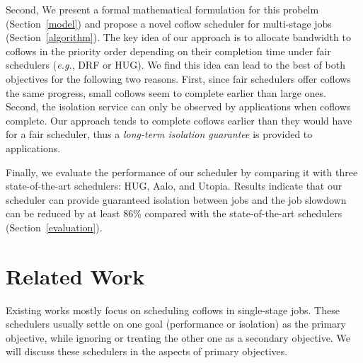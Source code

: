 \documentclass[10pt,journal,compsoc]{IEEEtran}
\begin{document}
Second, We present a formal mathematical formulation for this probelm (Section~\ref{model}) and propose a novel coflow scheduler for multi-stage jobs (Section~\ref{algorithm}).
%
The key idea of our approach is to allocate bandwidth to coflows in the priority order depending on their completion time under fair schedulers (\emph{e.g.}, DRF\cite{DRF} or HUG\cite{HUG}).
%
We find this idea can lead to the best of both objectives for the following two reasons.
%
First, since fair schedulers offer coflows the same progress, small coflows seem to complete earlier than large ones.
Second, the isolation service can only be observed by applications when coflows complete.
%
Our approach tends to complete coflows earlier than they would have for a fair scheduler, thus a \emph{long-term isolation guarantee} is provided to applications.

Finally, we evaluate the performance of our scheduler by comparing it with three state-of-the-art schedulers: HUG\cite{HUG}, Aalo\cite{aalo}, and Utopia\cite{utopia}.
%
Results indicate that our scheduler can provide guaranteed isolation between jobs and the job slowdown can be reduced by at least 86\% compared with the state-of-the-art schedulers (Section~\ref{evaluation}).

\section{Related Work}\label{related}
Existing works mostly focus on scheduling coflows in single-stage jobs.
%
These schedulers usually settle on one goal (performance or isolation) as the primary objective, while ignoring or treating the other one as a secondary objective.
%
We will discuss these schedulers in the aspects of primary objectives.
\end{document}
